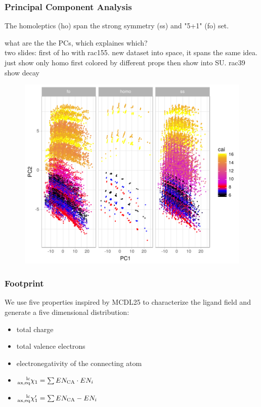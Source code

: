 \documentclass[xcolor=dvipsnames]{beamer}
\begin{document}
\begin{frame}
\frametitle{Principal Component Analysis}
The homoleptics (ho) span the strong symmetry (ss) and "5+1" (fo) set.

what are the the PCs, which explaines which?\\
two slides: first of ho with rac155. new dataset into space, it spans the same idea.\\
just show only homo first colored by different props then show into SU. rac39 \\
show decay

\begin{figure}
\includegraphics[width=0.65\linewidth]{img/pca.pdf}
\end{figure}

\end{frame}

\begin{frame}
	\frametitle{Footprint}
	We use five properties inspired by MCDL25 to characterize the ligand field and generate a five dimensional distribution:\\
	\begin{itemize}
	\item total charge
	\item total valence electrons
	\item electronegativity of the connecting atom
	\item $\prescript{\textrm{lc}}{\textrm{ax,eq}}{\chi}_1 = \sum{EN_{\textrm{CA}} \cdot EN_i}$
	\item $\prescript{\textrm{lc}}{\textrm{ax,eq}}{\chi}^{\prime}_1 = \sum{EN_{\textrm{CA}} - EN_i}$
	\end{itemize}
\end{frame}
\end{document}
